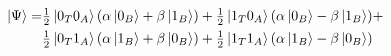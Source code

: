 \documentclass[border= 1cm]{standalone}
\begin{document}
$
\begin{aligned}
\ket{\Psi}=&\tfrac{1}{2}\ket{0_T0_A}(\alpha\ket{0_B}+\beta\ket{1_B}) +\tfrac{1}{2}\ket{1_T0_A}(\alpha\ket{0_B} - \beta\ket{1_B}) +\\
&\tfrac{1}{2}\ket{0_T1_A}(\alpha\ket{1_B} + \beta\ket{0_B}) +\tfrac{1}{2}\ket{1_T1_A}(\alpha\ket{1_B} - \beta\ket{0_B})\\
\end{aligned}
$
\end{document}
